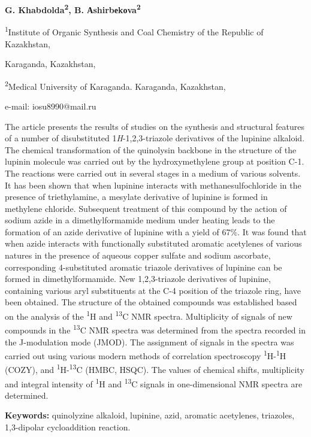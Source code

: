 \textbf{G. Khabdolda\textsuperscript{2}, B.
Аshirbеkоva\textsuperscript{2}}

\textsuperscript{1}Institute of Organic Synthesis and Coal Chemistry of
the Republic of Kazakhstan,

Karaganda, Kazakhstan,

\textsuperscript{2}Medical University of Karaganda. Karaganda,
Kazakhstan,

e-mail: iosu8990@mail.ru

The article presents the results of studies on the synthesis and
structural features of a number of disubstituted
1\emph{H}-1,2,3-triazole derivatives of the lupinine alkaloid. The
chemical transformation of the quinolysin backbone in the structure of
the lupinin molecule was carried out by the hydroxymethylene group at
position C-1. The reactions were carried out in several stages in a
medium of various solvents. It has been shown that when lupinine
interacts with methanesulfochloride in the presence of triethylamine, a
mesylate derivative of lupinine is formed in methylene chloride.
Subsequent treatment of this compound by the action of sodium azide in a
dimethylformamide medium under heating leads to the formation of an
azide derivative of lupinine with a yield of 67\%. It was found that
when azide interacts with functionally substituted aromatic acetylenes
of various natures in the presence of aqueous copper sulfate and sodium
ascorbate, corresponding 4-substituted aromatic triazole derivatives of
lupinine can be formed in dimethylformamide. New 1,2,3-triazole
derivatives of lupinine, containing various aryl substituents at the C-4
position of the triazole ring, have been obtained. The structure of the
obtained compounds was established based on the analysis of the
\textsuperscript{1}H and \textsuperscript{13}C NMR spectra. Multiplicity
of signals of new compounds in the \textsuperscript{13}C NMR spectra was
determined from the spectra recorded in the J-modulation mode (JMOD).
The assignment of signals in the spectra was carried out using various
modern methods of correlation spectroscopy
\textsuperscript{1}H-\textsuperscript{1}H (COZY), and
\textsuperscript{1}H-\textsuperscript{13}C (HMBC, HSQC). The values of
chemical shifts, multiplicity and integral intensity of
\textsuperscript{1}H and \textsuperscript{13}C signals in
one-dimensional NMR spectra are determined.

\textbf{Keywords:} quinolyzine alkaloid, lupinine, azid, aromatic
acetylenes, triazoles, 1,3-dipolar cycloaddition reaction.

